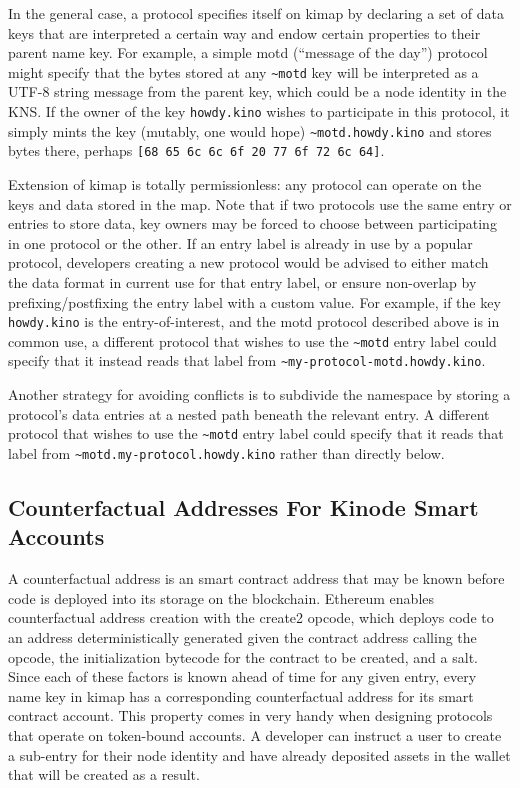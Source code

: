 \documentclass[runningheads]{llncs}
\begin{document}
In the general case, a protocol specifies itself on kimap by declaring a set of data keys that are interpreted a certain way and endow certain properties to their parent name key.
For example, a simple motd (``message of the day'') protocol might specify that the bytes stored at any \verb|~motd| key will be interpreted as a UTF-8 string message from the parent key, which could be a node identity in the KNS.
If the owner of the key \verb|howdy.kino| wishes to participate in this protocol, it simply mints the key (mutably, one would hope) \verb|~motd.howdy.kino| and stores bytes there, perhaps \verb|[68 65 6c 6c 6f 20 77 6f 72 6c 64]|.

Extension of kimap is totally permissionless: any protocol can operate on the keys and data stored in the map.
Note that if two protocols use the same entry or entries to store data, key owners may be forced to choose between participating in one protocol or the other.
If an entry label is already in use by a popular protocol, developers creating a new protocol would be advised to either match the data format in current use for that entry label, or ensure non-overlap by prefixing/postfixing the entry label with a custom value.
For example, if the key \verb|howdy.kino| is the entry-of-interest, and the motd protocol described above is in common use, a different protocol that wishes to use the \verb|~motd| entry label could specify that it instead reads that label from \verb|~my-protocol-motd.howdy.kino|.

Another strategy for avoiding conflicts is to subdivide the namespace by storing a protocol's data entries at a nested path beneath the relevant entry.
A different protocol that wishes to use the \verb|~motd| entry label could specify that it reads that label from \verb|~motd.my-protocol.howdy.kino| rather than directly below.

\subsection{Counterfactual Addresses For Kinode Smart Accounts}

A counterfactual address is an smart contract address that may be known before code is deployed into its storage on the blockchain.
Ethereum enables counterfactual address creation with the create2 opcode, which deploys code to an address deterministically generated given the contract address calling the opcode, the initialization bytecode for the contract to be created, and a salt.
Since each of these factors is known ahead of time for any given entry, every name key in kimap has a corresponding counterfactual address for its smart contract account.
This property comes in very handy when designing protocols that operate on token-bound accounts.
A developer can instruct a user to create a sub-entry for their node identity and have already deposited assets in the wallet that will be created as a result.
\end{document}
